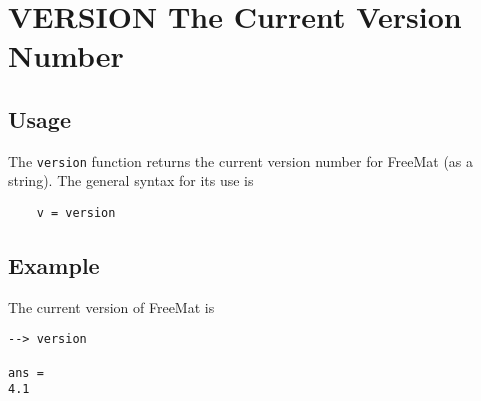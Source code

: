 \section{VERSION The Current Version Number}

\subsection{Usage}

The \verb|version| function returns the current version number for
FreeMat (as a string).  The general syntax for its use is
\begin{verbatim}
    v = version
\end{verbatim}
\subsection{Example}

The current version of FreeMat is
\begin{verbatim}
--> version

ans = 
4.1
\end{verbatim}
